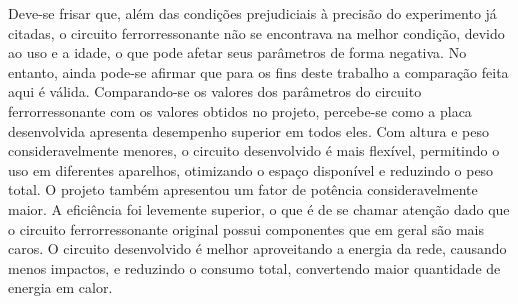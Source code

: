 Deve-se frisar que, além das condições prejudiciais à precisão do experimento já citadas, o circuito ferrorressonante não se encontrava na melhor condição, devido ao uso e a idade, o que pode afetar seus parâmetros de forma negativa. No entanto, ainda pode-se afirmar que para os fins deste trabalho a comparação feita aqui é válida. Comparando-se os valores dos parâmetros do circuito ferrorressonante com os valores obtidos no projeto, percebe-se como a placa desenvolvida apresenta desempenho superior em todos eles. Com altura e peso consideravelmente menores, o circuito desenvolvido é mais flexível, permitindo o uso em diferentes aparelhos, otimizando o espaço disponível e reduzindo o peso total. O projeto também apresentou um fator de potência consideravelmente maior. A eficiência foi levemente superior, o que é de se chamar atenção dado que o circuito ferrorressonante original possui componentes que em geral são mais caros. O circuito desenvolvido é melhor aproveitando a energia da rede, causando menos impactos, e reduzindo o consumo total, convertendo maior quantidade de energia em calor.
